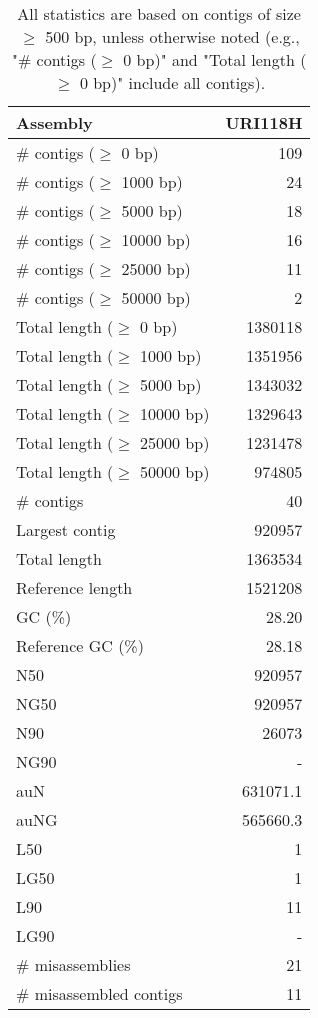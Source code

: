 \documentclass[12pt,a4paper]{article}
\begin{document}
\begin{table}[ht]
\begin{center}
\caption{All statistics are based on contigs of size $\geq$ 500 bp, unless otherwise noted (e.g., "\# contigs ($\geq$ 0 bp)" and "Total length ($\geq$ 0 bp)" include all contigs).}
\begin{tabular}{|l*{1}{|r}|}
\hline
Assembly & URI118H \\ \hline
\# contigs ($\geq$ 0 bp) & 109 \\ \hline
\# contigs ($\geq$ 1000 bp) & 24 \\ \hline
\# contigs ($\geq$ 5000 bp) & 18 \\ \hline
\# contigs ($\geq$ 10000 bp) & 16 \\ \hline
\# contigs ($\geq$ 25000 bp) & 11 \\ \hline
\# contigs ($\geq$ 50000 bp) & 2 \\ \hline
Total length ($\geq$ 0 bp) & 1380118 \\ \hline
Total length ($\geq$ 1000 bp) & 1351956 \\ \hline
Total length ($\geq$ 5000 bp) & 1343032 \\ \hline
Total length ($\geq$ 10000 bp) & 1329643 \\ \hline
Total length ($\geq$ 25000 bp) & 1231478 \\ \hline
Total length ($\geq$ 50000 bp) & 974805 \\ \hline
\# contigs & 40 \\ \hline
Largest contig & 920957 \\ \hline
Total length & 1363534 \\ \hline
Reference length & 1521208 \\ \hline
GC (\%) & 28.20 \\ \hline
Reference GC (\%) & 28.18 \\ \hline
N50 & 920957 \\ \hline
NG50 & 920957 \\ \hline
N90 & 26073 \\ \hline
NG90 & - \\ \hline
auN & 631071.1 \\ \hline
auNG & 565660.3 \\ \hline
L50 & 1 \\ \hline
LG50 & 1 \\ \hline
L90 & 11 \\ \hline
LG90 & - \\ \hline
\# misassemblies & 21 \\ \hline
\# misassembled contigs & 11 \\ \hline

\end{tabular}
\end{center}
\end{table}
\end{document}
